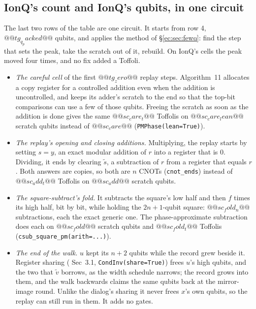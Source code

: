 \subsection{IonQ's count and IonQ's qubits, in one circuit}\label{ec:sec:onecircuit}

The last two rows of the table are one circuit. It starts from row 4, $@@tg_q_packed@@$ qubits,
and applies the method of \S\ref{ec:sec:fewq}: find the step that sets the peak, take the scratch
out of it, rebuild. On IonQ's cells the peak moved four times, and no fix added a Toffoli.

\begin{itemize}\setlength\itemsep{1pt}
\item \emph{The careful cell} of the first $@@tg_zero@@$ replay steps. Algorithm~11 allocates a copy
register for a controlled addition even when the addition is uncontrolled, and keeps its adder's
scratch to the end so that the top-bit comparisons can use a few of those qubits. Freeing the scratch
as soon as the addition is done gives the same $@@sc_care_t@@$ Toffolis on $@@sc_care_lean@@$ scratch
qubits instead of $@@sc_care@@$ (\texttt{PMPhase(lean=True)}).
\item \emph{The replay's opening and closing additions.} Multiplying, the replay starts by setting
$s=y$, an exact modular addition of $r$ into a register that is $0$. Dividing, it ends by clearing
$\tilde s$, a subtraction of $r$ from a register that equals $r$. Both answers are copies, so both
are $n$ CNOTs (\texttt{cnot\_ends}) instead of $@@sc_add_t@@$ Toffolis on $@@sc_add@@$ scratch
qubits.
\item \emph{The square-subtract's fold.} It subtracts the square's low half and then $f$ times its
high half, bit by bit, while holding the $2n+1$-qubit square: $@@sc_fold_n@@$ subtractions, each the
exact generic one. The phase-approximate subtraction does each on $@@sc_fold@@$ scratch qubits and
$@@sc_fold_t@@$ Toffolis (\texttt{csub\_square\_pm(arith=...)}).
\item \emph{The end of the walk.} $u$ kept its $n+2$ qubits while the record grew beside it.
Register sharing (\cite{ec:schrott26} Sec~3.1, \texttt{CondInv(share=True)}) frees $u$'s high
qubits, and the two that $\tilde v$ borrows, as the width schedule narrows; the record grows into them,
and the walk backwards claims the same qubits back at the mirror-image round. Unlike the dialog's
sharing it never frees $x$'s own qubits, so the replay can still run in them. It adds no gates.
\end{itemize}


